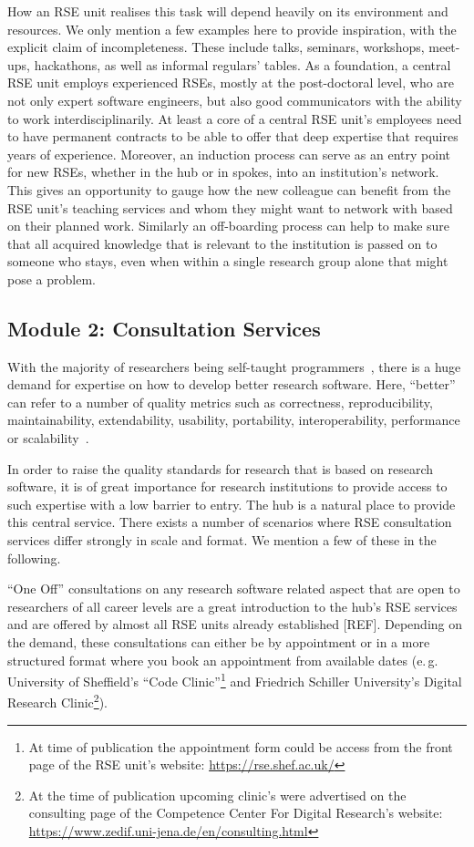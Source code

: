 \documentclass[a4paper]{article}
\makeatletter
\newcommand*{\eg}{e.\,g.\@\xspace}
\makeatother
\begin{document}
How an RSE unit realises this task will depend heavily on its environment and resources.
We only mention a few examples here to provide inspiration, with the explicit claim of incompleteness.
These include talks, seminars, workshops, meet-ups, hackathons, as well as informal regulars' tables.
As a foundation, a central RSE unit employs experienced RSEs, mostly at the post-doctoral level, who are not only expert software engineers, but also good communicators with the ability to work interdisciplinarily.
At least a core of a central RSE unit's employees need to have permanent contracts to be able to offer that deep expertise that requires years of experience.
Moreover, an induction process can serve as an entry point for new RSEs, whether in the hub or in spokes, into an institution's network.
This gives an opportunity to gauge how the new colleague can benefit from the RSE unit's teaching services and whom they might want to network with based on their planned work.
Similarly an off-boarding process can help to make sure that all acquired knowledge that is relevant to the institution is passed on to someone who stays, even when within a single research group alone that might pose a problem.

\subsection{Module 2: Consultation Services}%
\label{sec:consultation}

With the majority of researchers being self-taught programmers~\autocite{Carver2013}, there is a huge demand for expertise on how to develop better research software.
Here, “better” can refer to a number of quality metrics such as correctness, reproducibility, maintainability, extendability, usability, portability, interoperability, performance or scalability~\autocite[Chapter 16]{Schulmeyer2008}.

In order to raise the quality standards for research that is based on research software, it is of great importance for research institutions to provide access to such expertise with a low barrier to entry.
The hub is a natural place to provide this central service.
There exists a number of scenarios where RSE consultation services differ strongly in scale and format.
We mention a few of these in the following.

“One Off” consultations on any research software related aspect that are open to researchers of all career levels are
a great introduction to the hub's RSE services and are offered by almost all RSE units already established [REF].
Depending on the demand, these consultations can either be by appointment or in a more structured format where you book an appointment from available dates (\eg{} University of Sheffield's “Code Clinic”\footnote{At time of publication the appointment form could be access from the front page of the RSE unit’s website: \url{https://rse.shef.ac.uk/}} and Friedrich Schiller University’s Digital Research Clinic\footnote{At the time of publication upcoming clinic’s were advertised on the consulting page of the Competence Center For Digital Research’s website: \url{https://www.zedif.uni-jena.de/en/consulting.html}}).
\end{document}
